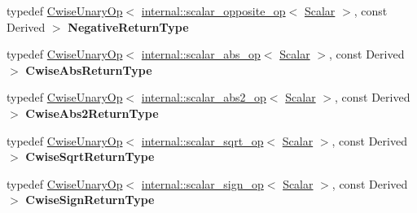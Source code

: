 \begin{DoxyCompactItemize}
typedef \mbox{\hyperlink{class_eigen_1_1_cwise_unary_op}{Cwise\+Unary\+Op}}$<$ \mbox{\hyperlink{struct_eigen_1_1internal_1_1scalar__opposite__op}{internal\+::scalar\+\_\+opposite\+\_\+op}}$<$ \mbox{\hyperlink{class_eigen_1_1_dense_base_a5feed465b3a8e60c47e73ecce83e39a2}{Scalar}} $>$, const Derived $>$ {\bfseries Negative\+Return\+Type}
\item 
\mbox{\label{class_eigen_1_1_matrix_base_a91040ac0211f1b61f9da765be8ef9889}} 
typedef \mbox{\hyperlink{class_eigen_1_1_cwise_unary_op}{Cwise\+Unary\+Op}}$<$ \mbox{\hyperlink{struct_eigen_1_1internal_1_1scalar__abs__op}{internal\+::scalar\+\_\+abs\+\_\+op}}$<$ \mbox{\hyperlink{class_eigen_1_1_dense_base_a5feed465b3a8e60c47e73ecce83e39a2}{Scalar}} $>$, const Derived $>$ {\bfseries Cwise\+Abs\+Return\+Type}
\item 
\mbox{\label{class_eigen_1_1_matrix_base_a269f4f723f1e7b44650338d57e170ac2}} 
typedef \mbox{\hyperlink{class_eigen_1_1_cwise_unary_op}{Cwise\+Unary\+Op}}$<$ \mbox{\hyperlink{struct_eigen_1_1internal_1_1scalar__abs2__op}{internal\+::scalar\+\_\+abs2\+\_\+op}}$<$ \mbox{\hyperlink{class_eigen_1_1_dense_base_a5feed465b3a8e60c47e73ecce83e39a2}{Scalar}} $>$, const Derived $>$ {\bfseries Cwise\+Abs2\+Return\+Type}
\item 
\mbox{\label{class_eigen_1_1_matrix_base_a6905fe1319e2618facdb56616bdc5cc0}} 
typedef \mbox{\hyperlink{class_eigen_1_1_cwise_unary_op}{Cwise\+Unary\+Op}}$<$ \mbox{\hyperlink{struct_eigen_1_1internal_1_1scalar__sqrt__op}{internal\+::scalar\+\_\+sqrt\+\_\+op}}$<$ \mbox{\hyperlink{class_eigen_1_1_dense_base_a5feed465b3a8e60c47e73ecce83e39a2}{Scalar}} $>$, const Derived $>$ {\bfseries Cwise\+Sqrt\+Return\+Type}
\item 
\mbox{\label{class_eigen_1_1_matrix_base_ab107c95b954d1048247bafad4b0d55ad}} 
typedef \mbox{\hyperlink{class_eigen_1_1_cwise_unary_op}{Cwise\+Unary\+Op}}$<$ \mbox{\hyperlink{struct_eigen_1_1internal_1_1scalar__sign__op}{internal\+::scalar\+\_\+sign\+\_\+op}}$<$ \mbox{\hyperlink{class_eigen_1_1_dense_base_a5feed465b3a8e60c47e73ecce83e39a2}{Scalar}} $>$, const Derived $>$ {\bfseries Cwise\+Sign\+Return\+Type}
\item 
\mbox{\label{class_eigen_1_1_matrix_base_a3eb8a80dd08d4a89857e9a7298c28046}} 

\end{DoxyCompactItemize}
